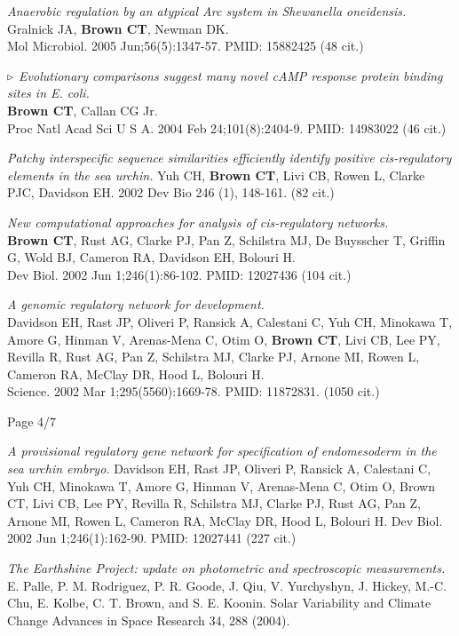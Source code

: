 \documentclass[margin,line]{resume}
\begin{document}
\begin{resume}
{\em Anaerobic regulation by an
atypical Arc system in {\em Shewanella oneidensis}.}\\
Gralnick JA, {\bf Brown CT}, Newman DK.\\
Mol Microbiol. 2005
Jun;56(5):1347-57.  PMID: 15882425 (48 cit.)

{\color{red} ${\bf \triangleright}$}
{\em Evolutionary comparisons suggest
many novel cAMP response protein binding sites in {\em E. coli}.}\\
{\bf Brown CT}, Callan CG Jr.\\
Proc Natl Acad Sci U S A. 2004 Feb 24;101(8):2404-9.  PMID: 14983022 (46 cit.)

{\em Patchy interspecific sequence similarities efficiently identify positive cis-regulatory elements in the sea urchin.}
Yuh CH, {\bf Brown CT}, Livi CB, Rowen L, Clarke PJC, Davidson EH.
2002 Dev Bio 246 (1), 148-161. (82 cit.)

  {\em New
computational approaches for analysis of {\em cis}-regulatory networks.}  \\
{\bf Brown CT}, Rust AG, Clarke PJ, Pan Z, Schilstra MJ, De Buysscher
T, Griffin G, Wold BJ, Cameron RA, Davidson EH, Bolouri H.\\
Dev Biol. 2002 Jun 1;246(1):86-102.  PMID: 12027436 (104 cit.)

{\em A genomic
regulatory network for development.}\\
Davidson EH, Rast JP, Oliveri P, Ransick A, Calestani C, Yuh CH,
Minokawa T, Amore G, Hinman V, Arenas-Mena C, Otim O, {\bf Brown CT}, Livi
CB, Lee PY, Revilla R, Rust AG, Pan Z, Schilstra MJ, Clarke PJ, Arnone
MI, Rowen L, Cameron RA, McClay DR, Hood L, Bolouri H.
\\Science. 2002 Mar
1;295(5560):1669-78.  PMID: 11872831. (1050 cit.)

\vspace{1cm}
{\centerline {Page 4/7}}

\newpage



{\em A provisional regulatory gene network for specification of endomesoderm in the sea urchin embryo.}
Davidson EH, Rast JP, Oliveri P, Ransick A, Calestani C, Yuh CH, Minokawa T, Amore G, Hinman V, Arenas-Mena C, Otim O, Brown CT, Livi CB, Lee PY, Revilla R, Schilstra MJ, Clarke PJ, Rust AG, Pan Z, Arnone MI, Rowen L, Cameron RA, McClay DR, Hood L, Bolouri H.
Dev Biol. 2002 Jun 1;246(1):162-90.
PMID: 12027441 (227 cit.)

{\em The Earthshine Project: update on photometric and spectroscopic measurements.}
 E. Palle, P. M. Rodriguez, P. R. Goode, J. Qiu, V. Yurchyshyn, J. Hickey, M.-C. Chu, E. Kolbe, C. T. Brown, and S. E. Koonin.
Solar Variability and Climate Change Advances in Space Research 34, 288 (2004).


\end{resume}
\end{document}
